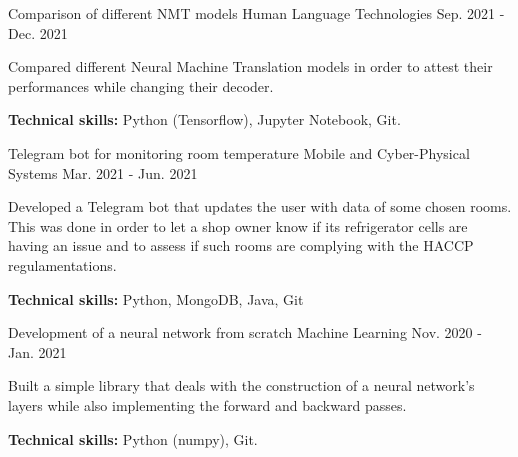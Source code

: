 \begin{cventries}
\cventry
{Comparison of different NMT models} %
{Human Language Technologies} %
{} %
{Sep. 2021 - Dec. 2021} %
{
    \begin{cvitems}
        \item{Compared different Neural Machine Translation models in order to attest their performances while changing their decoder.}
        \item{\textbf{Technical skills:} Python (Tensorflow), Jupyter Notebook, Git.} 
    \end{cvitems}
}

\cventry
{Telegram bot for monitoring room temperature} %
{Mobile and Cyber-Physical Systems} %
{} %
{Mar. 2021 - Jun. 2021} %
{
    \begin{cvitems}
        \item{Developed a Telegram bot that updates the user with data of some chosen rooms. This was done in order to let a shop owner know if its refrigerator cells are having an issue and to assess if such rooms are complying with the HACCP regulamentations.}
        \item{\textbf{Technical skills:} Python, MongoDB, Java, Git}
    \end{cvitems}
}

\cventry
{Development of a neural network from scratch} %
{Machine Learning} %
{} %
{Nov. 2020 - Jan. 2021} %
{
    \begin{cvitems}
        \item{Built a simple library that deals with the construction of a neural network's layers while also implementing the forward and backward passes.}
        \item{\textbf{Technical skills:} Python (numpy), Git.}
    \end{cvitems}
}

\end{cventries}
